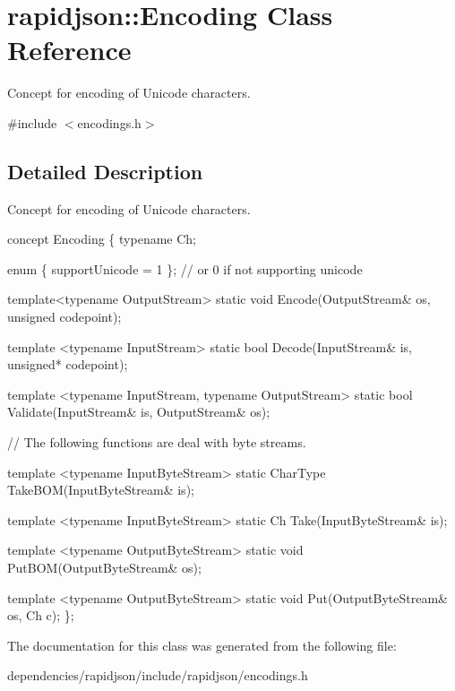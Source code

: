\hypertarget{classrapidjson_1_1_encoding}{}\section{rapidjson\+:\+:Encoding Class Reference}
\label{classrapidjson_1_1_encoding}


Concept for encoding of Unicode characters.  




{\ttfamily \#include $<$encodings.\+h$>$}



\subsection{Detailed Description}
Concept for encoding of Unicode characters. 


\begin{DoxyCode}
concept Encoding \{
    \textcolor{keyword}{typename} Ch;    

    \textcolor{keyword}{enum} \{ supportUnicode = 1 \}; \textcolor{comment}{// or 0 if not supporting unicode}

    \textcolor{keyword}{template}<\textcolor{keyword}{typename} OutputStream>
    \textcolor{keyword}{static} \textcolor{keywordtype}{void} Encode(OutputStream& os, \textcolor{keywordtype}{unsigned} codepoint);

    \textcolor{keyword}{template} <\textcolor{keyword}{typename} InputStream>
    \textcolor{keyword}{static} \textcolor{keywordtype}{bool} Decode(InputStream& is, \textcolor{keywordtype}{unsigned}* codepoint);

    \textcolor{keyword}{template} <\textcolor{keyword}{typename} InputStream, \textcolor{keyword}{typename} OutputStream>
    \textcolor{keyword}{static} \textcolor{keywordtype}{bool} Validate(InputStream& is, OutputStream& os);

    \textcolor{comment}{// The following functions are deal with byte streams.}

    \textcolor{keyword}{template} <\textcolor{keyword}{typename} InputByteStream>
    \textcolor{keyword}{static} CharType TakeBOM(InputByteStream& is);

    \textcolor{keyword}{template} <\textcolor{keyword}{typename} InputByteStream>
    \textcolor{keyword}{static} Ch Take(InputByteStream& is);

    \textcolor{keyword}{template} <\textcolor{keyword}{typename} OutputByteStream>
    \textcolor{keyword}{static} \textcolor{keywordtype}{void} PutBOM(OutputByteStream& os);

    \textcolor{keyword}{template} <\textcolor{keyword}{typename} OutputByteStream>
    \textcolor{keyword}{static} \textcolor{keywordtype}{void} Put(OutputByteStream& os, Ch c);
\};
\end{DoxyCode}
 

The documentation for this class was generated from the following file\+:\begin{DoxyCompactItemize}
\item 
dependencies/rapidjson/include/rapidjson/encodings.\+h\end{DoxyCompactItemize}
